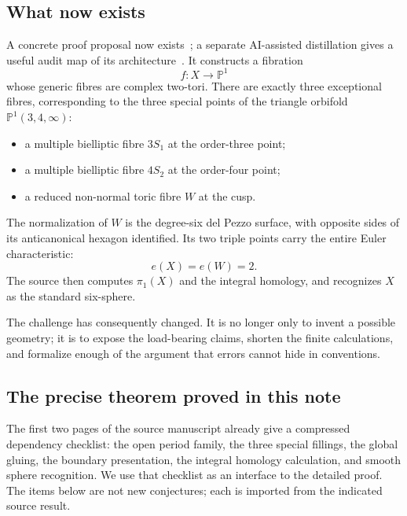 \documentclass[11pt,reqno]{amsart}
\numberwithin{equation}{section}
\newcommand{\Pone}{\mathbb P^1}
\theoremstyle{definition}
\begin{document}
\subsection{What now exists}

A concrete proof proposal now exists~\cite{S6}; a separate AI-assisted distillation gives a useful audit map of its architecture~\cite{Feng}. It constructs a fibration
\[
 f:X\longrightarrow \Pone
\]
whose generic fibres are complex two-tori. There are exactly three exceptional fibres, corresponding to the three special points of the triangle orbifold $\Pone(3,4,\infty)$:
\begin{itemize}
\item a multiple bielliptic fibre $3S_1$ at the order-three point;
\item a multiple bielliptic fibre $4S_2$ at the order-four point;
\item a reduced non-normal toric fibre $W$ at the cusp.
\end{itemize}
The normalization of $W$ is the degree-six del Pezzo surface, with opposite sides of its anticanonical hexagon identified. Its two triple points carry the entire Euler characteristic:
\[
 e(X)=e(W)=2.
\]
The source then computes $\pi_1(X)$ and the integral homology, and recognizes $X$ as the standard six-sphere.

The challenge has consequently changed. It is no longer only to invent a possible geometry; it is to expose the load-bearing claims, shorten the finite calculations, and formalize enough of the argument that errors cannot hide in conventions.

\subsection{The precise theorem proved in this note}

The first two pages of the source manuscript already give a compressed dependency checklist: the open period family, the three special fillings, the global gluing, the boundary presentation, the integral homology calculation, and smooth sphere recognition. We use that checklist as an interface to the detailed proof. The items below are not new conjectures; each is imported from the indicated source result.
\end{document}
